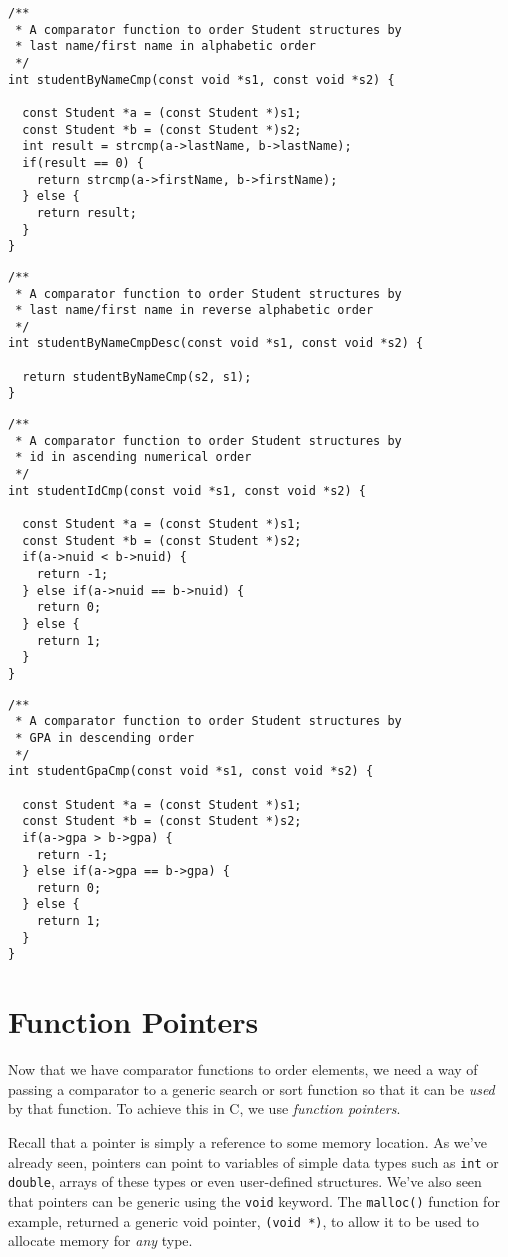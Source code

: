 \begin{verbatim}
/**
 * A comparator function to order Student structures by 
 * last name/first name in alphabetic order
 */
int studentByNameCmp(const void *s1, const void *s2) {

  const Student *a = (const Student *)s1;
  const Student *b = (const Student *)s2;
  int result = strcmp(a->lastName, b->lastName);
  if(result == 0) {
    return strcmp(a->firstName, b->firstName);
  } else {
    return result;
  }
}
\end{verbatim}

\begin{verbatim}
/**
 * A comparator function to order Student structures by 
 * last name/first name in reverse alphabetic order
 */
int studentByNameCmpDesc(const void *s1, const void *s2) {

  return studentByNameCmp(s2, s1);
}
\end{verbatim}

\begin{verbatim}
/**
 * A comparator function to order Student structures by 
 * id in ascending numerical order
 */
int studentIdCmp(const void *s1, const void *s2) {

  const Student *a = (const Student *)s1;
  const Student *b = (const Student *)s2;
  if(a->nuid < b->nuid) {
    return -1;
  } else if(a->nuid == b->nuid) {
    return 0;
  } else {
    return 1;
  }
}
\end{verbatim}

\begin{verbatim}
/**
 * A comparator function to order Student structures by 
 * GPA in descending order
 */
int studentGpaCmp(const void *s1, const void *s2) {

  const Student *a = (const Student *)s1;
  const Student *b = (const Student *)s2;
  if(a->gpa > b->gpa) {
    return -1;
  } else if(a->gpa == b->gpa) {
    return 0;
  } else {
    return 1;
  }
}
\end{verbatim}

\section{Function Pointers}

Now that we have comparator functions to order elements, we need a way
of passing a comparator to a generic search or sort function so that it
can be \emph{used} by that function.  To achieve this in C, we use
\emph{function pointers}.  

Recall that a pointer is simply a reference to some memory location.
As we've already seen, pointers can point to variables of simple
data types such as \texttt{int} or \texttt{double}, 
arrays of these types or even user-defined structures.  We've also
seen that pointers can be generic using the \texttt{void} keyword.
The \texttt{malloc()} function for example, returned a generic
void pointer, \texttt{(void *)}, to allow it to be used to allocate
memory for \emph{any} type.

